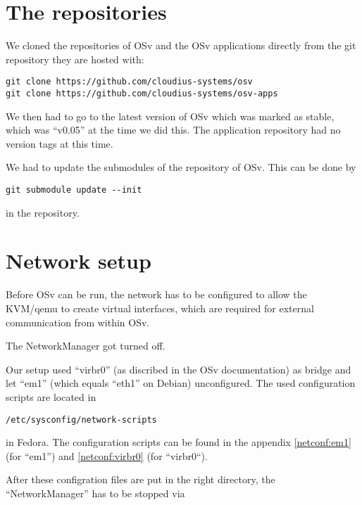     \section{The repositories}

        We cloned the repositories of OSv and the OSv applications directly from
        the git repository they are hosted with:

\begin{lstlisting}
git clone https://github.com/cloudius-systems/osv
git clone https://github.com/cloudius-systems/osv-apps
\end{lstlisting}

        We then had to go to the latest version of OSv which was marked as
        stable, which was ``v0.05'' at the time we did this. The application
        repository had no version tags at this time.

        We had to update the submodules of the repository of OSv. This can be
        done by

\begin{lstlisting}
git submodule update --init
\end{lstlisting}

        in the repository.

    \section{Network setup}

        Before OSv can be run, the network has to be configured to allow the
        KVM/qemu to create virtual interfaces, which are required for external
        communication from within OSv.

        The NetworkManager got turned off.

        Our setup used ``virbr0'' (as discribed in the OSv documentation) as
        bridge and let ``em1'' (which equals ``eth1'' on Debian) unconfigured.
        The used configuration scripts are located in

\begin{lstlisting}
/etc/sysconfig/network-scripts
\end{lstlisting}

        in Fedora. The configuration scripts can be found in the appendix
        \ref{netconf:em1} (for ``em1'') and \ref{netconf:virbr0} (for
        ``virbr0``).

        After these configration files are put in the right directory, the
        ``NetworkManager'' has to be stopped via

